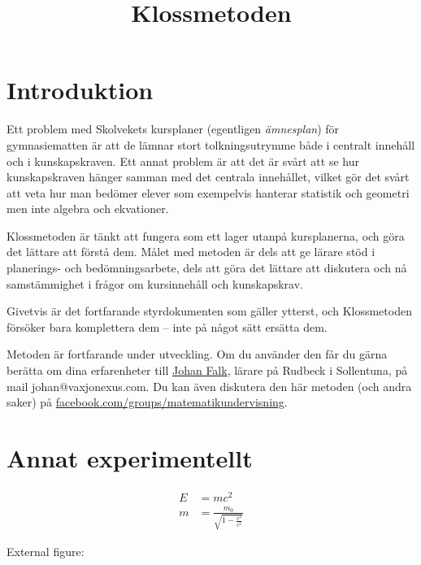 \documentclass[12pt]{article}
\title{Klossmetoden}
\date{}
\begin{document}
  \maketitle
  
  \section{Introduktion}
  Ett problem med Skolvekets kursplaner (egentligen \textit{ämnesplan}) för gymnasiematten är att de lämnar stort tolkningsutrymme både i centralt innehåll och i kunskapskraven.
  Ett annat problem är att det är svårt att se hur kunskapskraven hänger samman med det centrala innehållet, vilket gör det svårt att veta hur man bedömer elever som exempelvis hanterar statistik och geometri men inte algebra och ekvationer.

  Klossmetoden är tänkt att fungera som ett lager utanpå kursplanerna, och göra det lättare att förstå dem.
  Målet med metoden är dels att ge lärare stöd i planerings- och bedömningsarbete, dels att göra det lättare att diskutera och nå samstämmighet i frågor om kursinnehåll och kunskapskrav.

  Givetvis är det fortfarande styrdokumenten som gäller ytterst, och Klossmetoden försöker bara komplettera dem – inte på något sätt ersätta dem.

  Metoden är fortfarande under utveckling.
  Om du använder den får du gärna berätta om dina erfarenheter till \href{mailto:johan.falk@rudbeck.se}{Johan Falk}, lärare på Rudbeck i Sollentuna, på mail johan@vaxjonexus.com.
  Du kan även diskutera den här metoden (och andra saker) på \href{https://www.facebook.com/groups/matematikundervisning/}{facebook.com/groups/matematikundervisning}.
 
  \section{Annat experimentellt}
  \begin{align}
    E &= mc^2                              \\
    m &= \frac{m_0}{\sqrt{1-\frac{v^2}{c^2}}}
  \end{align}
  
  
  
  External figure:
  
\end{document}
